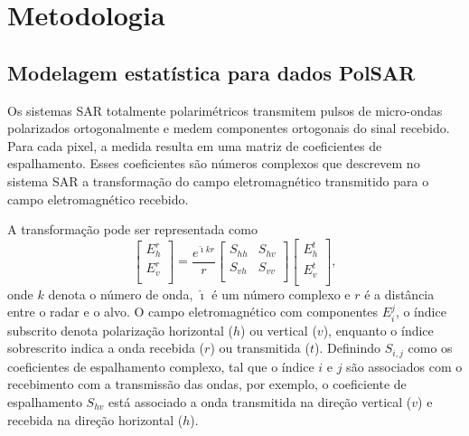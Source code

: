 \chapter{Metodologia}\label{metodologia}

\section{Modelagem estatística para dados PolSAR}\label{cap_acf_sec1}
Os sistemas SAR totalmente polarimétricos transmitem pulsos de micro-ondas polarizados ortogonalmente e medem componentes ortogonais do sinal recebido. Para cada pixel, a medida resulta em uma matriz de coeficientes de espalhamento. Esses coeficientes são números complexos que descrevem no sistema SAR a transformação do campo eletromagnético transmitido para o campo eletromagnético recebido.

A transformação pode ser representada como
\begin{equation}\label{cap_acf_1}
 \left[
\begin{array}{c}
	E_{h}^{r}   \\
	E_{v}^{r}    \\
\end{array}
\right]
 = \frac{e^{\hat{\imath} kr}}{r}\left[
\begin{array}{cc}
	S_{hh}   & S_{hv}   \\
	S_{vh}   & S_{vv}   \\
\end{array}
\right]
 \left[
\begin{array}{c}
	E_{h}^{t}   \\
	E_{v}^{t}    \\
\end{array}
\right],
\end{equation}
onde $k$ denota o número de onda, $\hat{\imath}$ é um número complexo e $r$ é a distância entre o radar e o alvo. O campo eletromagnético com componentes $E_{i}^{j}$, o índice subscrito denota polarização horizontal ($h$) ou vertical ($v$),  enquanto o índice sobrescrito indica a onda recebida ($r$) ou transmitida ($t$). Definindo $S_{i,j}$ como os coeficientes de espalhamento complexo, tal que o índice $i$ e $j$ são associados com o recebimento com a transmissão das ondas, por exemplo, o coeficiente de espalhamento $S_{hv}$ está associado a onda transmitida na direção vertical ($v$) e recebida na direção horizontal ($h$).

